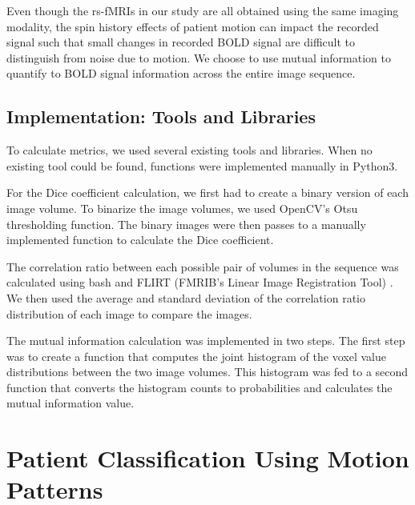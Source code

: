Even though the rs-fMRIs in our study are all obtained using the same imaging modality, the spin history effects of patient motion can impact the recorded signal such that small changes in recorded BOLD signal are difficult to distinguish from noise due to motion. We choose to use mutual information to quantify to BOLD signal information across the entire image sequence.

\subsection{Implementation: Tools and Libraries}

To calculate metrics, we used several existing tools and libraries. When no existing tool could be found, functions were implemented manually in Python3. 

For the Dice coefficient calculation, we first had to create a binary version of each image volume. To binarize the image volumes, we used OpenCV's Otsu thresholding function. The binary images were then passes to a manually implemented function to calculate the Dice coefficient.

The correlation ratio between each possible pair of volumes in the sequence was calculated using bash and FLIRT (FMRIB’s Linear Image Registration Tool) \cite{Jenkinson2001} \cite{Jenkinson2002}. We then used the average and standard deviation of the correlation ratio distribution of each image to compare the images.

The mutual information calculation was implemented in two steps. The first step was to create a function that computes the joint histogram of the voxel value distributions between the two image volumes. This histogram was fed to a second function that converts the histogram counts to probabilities and calculates the mutual information value. 


\section{Patient Classification Using Motion Patterns} 

